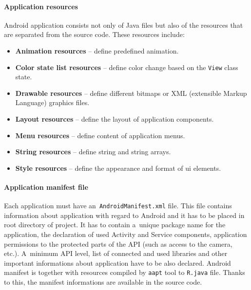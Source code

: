 \paragraph{Application resources}
Android application consists not only of Java files but also of the resources that are separated from the source code.
These resources include:

\begin{itemize}
    \item \textbf{Animation resources} -- define predefined animation.
    \item \textbf{Color state list resources} -- define color change based on the \texttt{View} class state.
    \item \textbf{Drawable resources} -- define different bitmaps or XML (extensible Markup Language) graphics files.
    \item \textbf{Layout resources} -- define the layout of application components.
    \item \textbf{Menu resources} -- define content of application menus.
    \item \textbf{String resources} -- define string and string arrays.
    \item \textbf{Style resources} -- define the appearance and format of ui elements.
\end{itemize}

\paragraph{Application manifest file}
Each application must have an~\texttt{AndroidManifest.xml} file. This file contains information about application with
regard to Android and it has to be placed in root directory of project. It has to contain a~unique package name for the
application, the declaration of used Activity and Service components, application permissions to the protected parts of
the API (such as access to the camera, etc.). A~minimum API level, list of connected and used libraries and other
important informations about application have to be also declared. Android manifest is together with resources compiled
by \texttt{aapt} tool to \texttt{R.java} file. Thanks to this, the manifest informations are available in the source
code.

